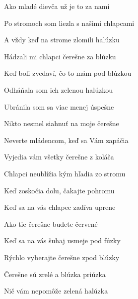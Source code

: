 \begin{song}


\large


\Large

\bigskip

 Ako mladé dievča  už je to  za nami \par
{} Po stromoch som liezla  s našimi  chlapcami \par
{}A vždy keď na strome zlomili halúzku \par
{}Hádzali mi chlapci čerešne za blúzku \par
{}Keď boli zvedaví, čo to mám pod blúzkou \par
{}Odháňala som ich zelenou halúzkou \par

\bigskip


\bigskip

 Ubránila som sa  viac menej  úspešne \par
{} Nikto nesmel siahnuť  na moje  čerešne \par
{}Neverte mládencom, keď sa Vám zapáčia \par
{}Vyjedia vám všetky čerešne z koláča \par
{}Chlapci neublížia kým hľadia zo stromu \par
{}Keď zoskočia dolu, čakajte pohromu \par

\bigskip


\bigskip

 Keď sa na vás chlapec  zadíva  uprene \par
{} Ako tie čerešne  budete  červené \par
{}Keď sa na vás šuhaj usmeje pod fúzky \par
{}Rýchlo vyberajte čerešne zpod blúzky \par
{}Čerešne sú zrelé a blúzka priúzka \par
{}Nič vám nepomôže zelená halúzka \par

\end{song}